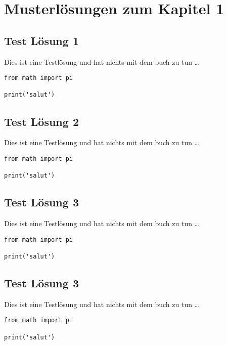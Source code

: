 \section{Musterlösungen zum Kapitel
1}\label{musterluxf6sungen-zum-kapitel-1}

\subsection{Test Lösung 1}\label{test-luxf6sung-1}

Dies ist eine Testlösung und hat nichts mit dem buch zu tun \ldots{}

\begin{verbatim}
from math import pi

print('salut')
\end{verbatim}

\subsection{Test Lösung 2}\label{test-luxf6sung-2}

Dies ist eine Testlösung und hat nichts mit dem buch zu tun \ldots{}

\begin{verbatim}
from math import pi

print('salut')
\end{verbatim}

\subsection{Test Lösung 3}\label{test-luxf6sung-3}

Dies ist eine Testlösung und hat nichts mit dem buch zu tun \ldots{}

\begin{verbatim}
from math import pi

print('salut')
\end{verbatim}

\subsection{Test Lösung 3}\label{test-luxf6sung-3-1}

Dies ist eine Testlösung und hat nichts mit dem buch zu tun \ldots{}

\begin{verbatim}
from math import pi

print('salut')
\end{verbatim}

